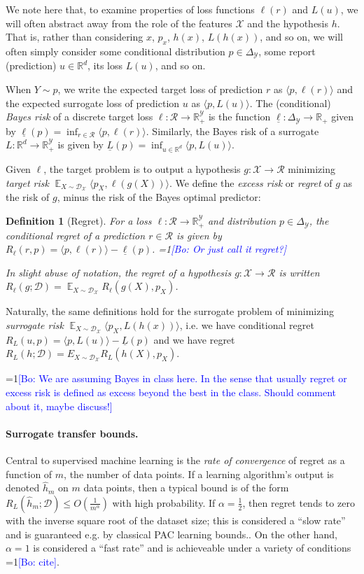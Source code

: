 \documentclass{article}
\newtheorem{definition}{Definition}
\newcommand{\Comments}{1}
\newcommand{\mynote}[2]{\ifnum\Comments=1\textcolor{#1}{#2}\fi}
\newcommand{\bo}[1]{\mynote{blue}{[Bo: #1]}}
\newcommand{\reals}{\mathbb{R}}
\newcommand{\simplex}{\Delta_\Y}
\newcommand{\D}{\mathcal{D}}
\DeclareMathOperator{\E}{\mathbb{E}}  %
\newcommand{\R}{\mathcal{R}}
\newcommand{\X}{\mathcal{X}}
\newcommand{\Y}{\mathcal{Y}}
\newcommand{\risk}[1]{\underline{#1}}
\newcommand{\inprod}[2]{\langle #1, #2 \rangle}%
\begin{document}
We note here that, to examine properties of loss functions $\ell(r)$ and $L(u)$, we will often abstract away from the role of the features $\X$ and the hypothesis $h$.
That is, rather than considering $x$, $p_x$, $h(x)$, $L(h(x))$, and so on, we will often simply consider some conditional distribution $p \in \simplex$, some report (prediction) $u \in \reals^d$, its loss $L(u)$, and so on.

When $Y \sim p$, we write the expected target loss of prediction $r$ as $\inprod{p}{\ell(r)}$ and the expected surrogate loss of prediction $u$ as $\inprod{p}{L(u)}$.
The (conditional) \emph{Bayes risk} of a discrete target loss $\ell: \R \to \reals^{\Y}_+$ is the function $\risk{\ell}: \simplex \to \reals_+$ given by $\risk{\ell}(p) = \inf_{r \in \R} \inprod{p}{\ell(r)}$.
Similarly, the Bayes risk of a surrogate $L: \reals^d \to \reals^{\Y}_+$ is given by $\risk{L}(p) = \inf_{u\in\reals^d} \inprod{p}{L(u)}$.

Given $\ell$, the target problem is to output a hypothesis $g: \X \to \R$ minimizing \emph{target risk} $\E_{X \sim \D_\X} \inprod{p_X}{\ell(g(X))}$.
We define the \emph{excess risk} or \emph{regret} of $g$ as the risk of $g$, minus the risk of the Bayes optimal predictor:
\begin{definition}[Regret] \label{def:full-regret}
  For a loss $\ell: \R \to \reals^{\Y}_+$ and distribution $p \in \simplex$, the \emph{conditional regret} of a prediction $r \in \R$ is given by $R_{\ell}(r,p) = \inprod{p}{\ell(r)} - \risk{\ell}(p)$. \bo{Or just call it regret?}

  In slight abuse of notation, the \emph{regret} of a hypothesis $g: \X \to \R$ is written $R_{\ell}(g; \D) = \E_{X \sim \D_{\X}} R_{\ell}(g(X), p_X)$.
\end{definition}
Naturally, the same definitions hold for the surrogate problem of minimizing \emph{surrogate risk} $\E_{X \sim \D_\X} \inprod{p_X}{L(h(x))}$, i.e. we have conditional regret $R_L(u,p) = \inprod{p}{L(u)} - \risk{L}(p)$ and we have regret $R_L(h;\D) = E_{X \sim \D_{\X}} R_L(h(X), p_X)$.

\bo{We are assuming Bayes in class here. In the sense that usually regret or excess risk is defined as excess beyond the best in the class. Should comment about it, maybe discuss!}

\paragraph{Surrogate transfer bounds.}
Central to supervised machine learning is the \emph{rate of convergence} of regret as a function of $m$, the number of data points.
If a learning algorithm's output is denoted $\hat{h}_m$ on $m$ data points, then a typical bound is of the form $R_L(\hat{h}_m;\D) \leq O\left(\frac{1}{m^{\alpha}}\right)$ with high probability.
If $\alpha = \frac{1}{2}$, then regret tends to zero with the inverse square root of the dataset size; this is considered a ``slow rate'' and is guaranteed e.g. by classical PAC learning bounds..
On the other hand, $\alpha = 1$ is considered a ``fast rate'' and is achieveable under a variety of conditions \bo{cite}.
\end{document}

